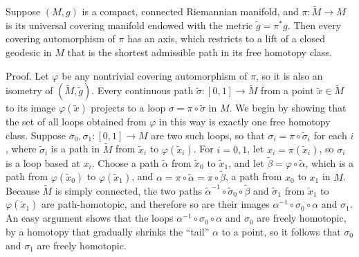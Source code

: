 \begin{lemma}
\label{lem:covering-automorphism-axis}
Suppose $(M, g)$ is a compact, connected Riemannian manifold, and $\pi : \widetilde{M} \to M$ is its universal covering manifold endowed with the metric $\widetilde{g} = \pi^* g$. Then every covering automorphism of $\pi$ has an axis, which restricts to a lift of a closed geodesic in $M$ that is the shortest admissible path in its free homotopy class.

Proof. Let $\varphi$ be any nontrivial covering automorphism of $\pi$, so it is also an isometry of $(\widetilde{M}, \widetilde{g})$. Every continuous path $\widetilde{\sigma} : [0, 1] \to \widetilde{M}$ from a point $\widetilde{x} \in \widetilde{M}$ to its image $\varphi(\widetilde{x})$ projects to a loop $\sigma = \pi \circ \widetilde{\sigma}$ in $M$. We begin by showing that the set of all loops obtained from $\varphi$ in this way is exactly one free homotopy class. Suppose $\sigma_0, \sigma_1 : [0, 1] \to M$ are two such loops, so that $\sigma_i = \pi \circ \widetilde{\sigma}_i$ for each $i$, where $\widetilde{\sigma}_i$ is a path in $\widetilde{M}$ from $\widetilde{x}_i$ to $\varphi(\widetilde{x}_i)$.
For $i = 0, 1$, let $x_i = \pi(\widetilde{x}_i)$, so $\sigma_i$ is a loop based at $x_i$. Choose a path $\widetilde{\alpha}$ from $\widetilde{x}_0$ to $\widetilde{x}_1$, and let $\widetilde{\beta} = \varphi \circ \widetilde{\alpha}$, which is a path from $\varphi(\widetilde{x}_0)$ to $\varphi(\widetilde{x}_1)$, and $\alpha = \pi \circ \widetilde{\alpha} = \pi \circ \widetilde{\beta}$, a path from $x_0$ to $x_1$ in $M$. Because $\widetilde{M}$ is simply connected, the two paths $\widetilde{\alpha}^{-1} \circ \widetilde{\sigma}_0 \circ \widetilde{\beta}$ and $\widetilde{\sigma}_1$ from $\widetilde{x}_1$ to $\varphi(\widetilde{x}_1)$ are path-homotopic, and therefore so are their images $\alpha^{-1} \circ \sigma_0 \circ \alpha$ and $\sigma_1$. An easy argument shows that the loops $\alpha^{-1} \circ \sigma_0 \circ \alpha$ and $\sigma_0$ are freely homotopic, by a homotopy that gradually shrinks the ``tail'' $\alpha$ to a point, so it follows that $\sigma_0$ and $\sigma_1$ are freely homotopic.



\end{lemma}
